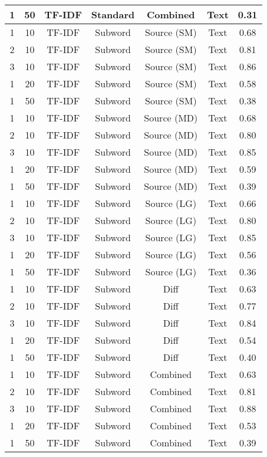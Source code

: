 \begin{longtable}{|c|c|c|c|c|c|c|}
\hline
1 & 50 & TF-IDF & Standard & Combined & Text & 0.31 \\
\hline
1 & 10 & TF-IDF & Subword & Source (SM) & Text & 0.68 \\
\hline
2 & 10 & TF-IDF & Subword & Source (SM) & Text & 0.81 \\
\hline
3 & 10 & TF-IDF & Subword & Source (SM) & Text & 0.86 \\
\hline
1 & 20 & TF-IDF & Subword & Source (SM) & Text & 0.58 \\
\hline
1 & 50 & TF-IDF & Subword & Source (SM) & Text & 0.38 \\
\hline
1 & 10 & TF-IDF & Subword & Source (MD) & Text & 0.68 \\
\hline
2 & 10 & TF-IDF & Subword & Source (MD) & Text & 0.80 \\
\hline
3 & 10 & TF-IDF & Subword & Source (MD) & Text & 0.85 \\
\hline
1 & 20 & TF-IDF & Subword & Source (MD) & Text & 0.59 \\
\hline
1 & 50 & TF-IDF & Subword & Source (MD) & Text & 0.39 \\
\hline
1 & 10 & TF-IDF & Subword & Source (LG) & Text & 0.66 \\
\hline
2 & 10 & TF-IDF & Subword & Source (LG) & Text & 0.80 \\
\hline
3 & 10 & TF-IDF & Subword & Source (LG) & Text & 0.85 \\
\hline
1 & 20 & TF-IDF & Subword & Source (LG) & Text & 0.56 \\
\hline
1 & 50 & TF-IDF & Subword & Source (LG) & Text & 0.36 \\
\hline
1 & 10 & TF-IDF & Subword & Diff & Text & 0.63 \\
\hline
2 & 10 & TF-IDF & Subword & Diff & Text & 0.77 \\
\hline
3 & 10 & TF-IDF & Subword & Diff & Text & 0.84 \\
\hline
1 & 20 & TF-IDF & Subword & Diff & Text & 0.54 \\
\hline
1 & 50 & TF-IDF & Subword & Diff & Text & 0.40 \\
\hline
1 & 10 & TF-IDF & Subword & Combined & Text & 0.63 \\
\hline
2 & 10 & TF-IDF & Subword & Combined & Text & 0.81 \\
\hline
3 & 10 & TF-IDF & Subword & Combined & Text & 0.88 \\
\hline
1 & 20 & TF-IDF & Subword & Combined & Text & 0.53 \\
\hline
1 & 50 & TF-IDF & Subword & Combined & Text & 0.39 \\

\end{longtable}
